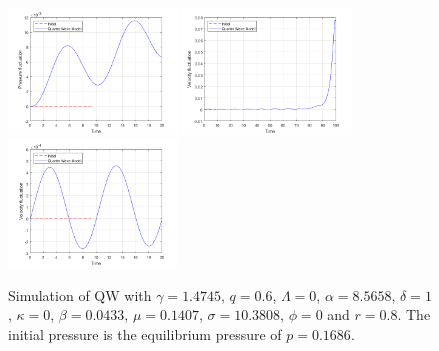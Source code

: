 \begin{figure}[!ht]
    \includegraphics[width=0.4\textwidth]{Figures/QWMSimulation/NearEquilibriumOscillations/B-Short.png}
    \includegraphics[width=0.4\textwidth]{Figures/QWMSimulation/NearEquilibriumOscillations/C.png}
    \includegraphics[width=0.4\textwidth]{Figures/QWMSimulation/NearEquilibriumOscillations/C-Short.png}
    \caption{Simulation of QW with $\gamma = 1.4745$, $q = 0.6$, $\Lambda = 0$, $\alpha = 8.5658$, $\delta = 1$, $\kappa = 0$, $\beta = 0.0433$, $\mu = 0.1407$, $\sigma = 10.3808$, $\phi = 0$ and $r = 0.8$. The initial pressure is the equilibrium pressure of $p = 0.1686$.}
    \label{fig: QWNearEquil}
\end{figure}